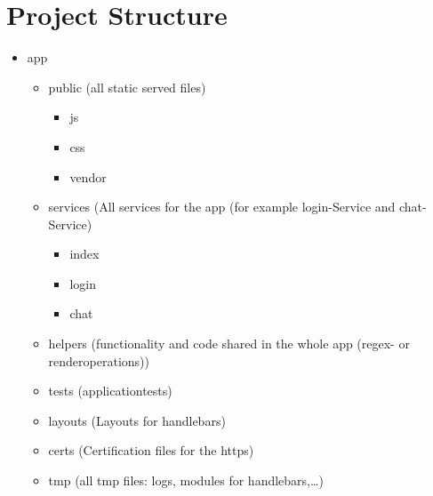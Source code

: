 \documentclass[10pt,a4paper,landscape]{article}
\begin{document}
\section{Project Structure}
\begin{itemize}
        \renewcommand{\labelitemi}{$--$}
        \renewcommand{\labelitemii}{$--$}
        \renewcommand{\labelitemiii}{$--$}
        \renewcommand{\labelitemiv}{$--$}
        \item
            app\\
            \begin{itemize}
                    \item
                        public (all static served files)\\
                        \begin{itemize}
                                \item
                                    js\\
                                \item 
                                    css\\
                                \item 
                                    vendor\\
                        \end{itemize}
                    \item
                        services (All services for the app (for example login-Service and chat-Service)\\
                        \begin{itemize}
                                \item
                                    index\\
                                \item
                                    login\\
                                \item 
                                    chat\\
                        \end{itemize}
                    \item
                        helpers (functionality and code shared in the whole app (regex- or renderoperations))\\
                    \item
                        tests (applicationtests)\\
                    \item
                        layouts (Layouts for handlebars)\\
                    \item
                        certs (Certification files for the https)\\
                    \item
                        tmp (all tmp files: logs, modules for handlebars,\dots)\\
            \end{itemize}
\end{itemize}
\end{document}
